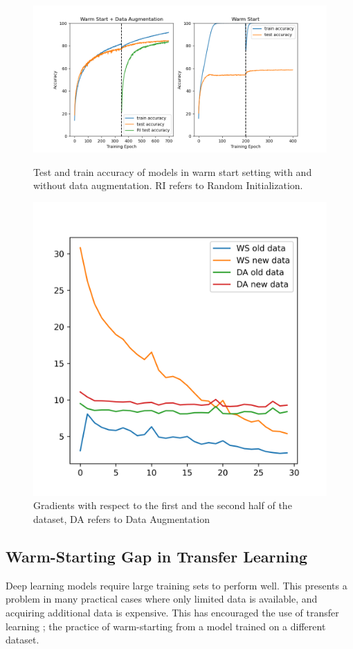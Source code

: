 \begin{figure}
    \begin{minipage}[t]{.60\linewidth}
    \centering
    \includegraphics[width=\linewidth]{figures/fig_aug.png}
    \caption{Test and train accuracy of models in warm start setting with and without data augmentation. RI refers to Random Initialization.}
    \label{fig:fig_aug}
    \end{minipage}
    \hfill
    \begin{minipage}[t]{.37\linewidth}
    \centering
    \includegraphics[width=.8\linewidth]{figures/fig5_aug.png}
    \caption{Gradients with respect to the first and the second half of the dataset, DA refers to Data Augmentation}
    \label{fig:fig_aug_grad}
    \end{minipage}

\end{figure}

\subsection{Warm-Starting Gap in Transfer Learning}
Deep learning models require large training sets to perform well. This presents a problem in many practical cases where only limited data is available, and acquiring additional data is expensive. This has encouraged the use of transfer learning \cite{oquab_learning_2014,huang_cross-language_2013,long_unsupervised_2016}; the practice of warm-starting from a model trained on a different dataset. 

